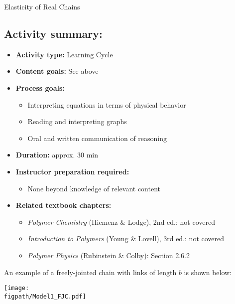 \begin{activity}[extension]{Elasticity of Real Chains}
\begin{instructornotes}
	\subsection*{Activity summary:}
	\begin{itemize}
		\item \textbf{Activity type:} Learning Cycle
		\item \textbf{Content goals:} See above
		\item \textbf{Process goals:} %
			\begin{itemize}
				\item Interpreting equations in terms of physical behavior
				\item Reading and interpreting graphs
				\item Oral and written communication of reasoning
			\end{itemize}
		\item \textbf{Duration:} approx. 30 min
		\item \textbf{Instructor preparation required:} 
			\begin{itemize}
				\item None beyond knowledge of relevant content
			\end{itemize}
		\item \textbf{Related textbook chapters:}
			\begin{itemize}
				\item \emph{Polymer Chemistry} (Hiemenz \& Lodge), 2nd ed.: not covered
				\item \emph{Introduction to Polymers} (Young \& Lovell), 3rd ed.: not covered
				\item \emph{Polymer Physics} (Rubinstein \& Colby): Section 2.6.2
			\end{itemize}
	\end{itemize}

\end{instructornotes}



\begin{model}
\label{\labelbase:model:chainstretching}

	An example of a freely-jointed chain with links of length $b$ is shown below:
	
	\vspace{6pt}
	\centerline{\texttt{[image: \\figpath/Model1\_FJC.pdf]}}


\end{model}
\end{activity}
